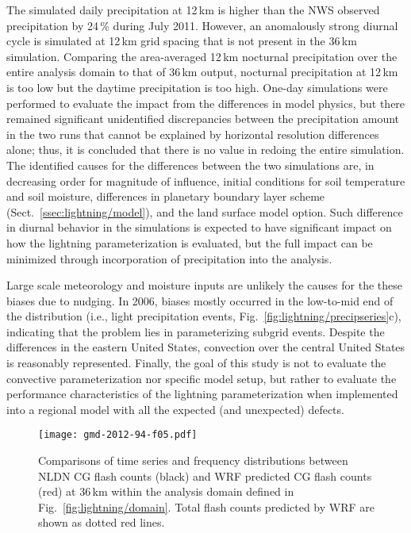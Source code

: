 The simulated daily precipitation at 12\,\unit{km} is higher than the NWS
observed precipitation by 24\,{\%} during July 2011. However, an anomalously
strong diurnal cycle is simulated at 12\,\unit{km} grid spacing that is not
present in the 36\,\unit{km} simulation. Comparing the area-averaged
12\,\unit{km} nocturnal precipitation over the entire analysis domain to that
of 36\,\unit{km} output, nocturnal precipitation at 12\,\unit{km} is too low
but the daytime precipitation is too high. One-day simulations were
performed to evaluate the impact from the differences in model physics, but
there remained significant unidentified discrepancies between the
precipitation amount in the two runs that cannot be explained by horizontal
resolution differences alone; thus, it is concluded that there is no value in
redoing the entire simulation. The identified causes for the differences
between the two simulations are, in decreasing order for magnitude of
influence, initial conditions for soil temperature and soil moisture,
differences in planetary boundary layer scheme (Sect.~\ref{ssec:lightning/model}), and
the land surface model option. Such difference in diurnal behavior in the
simulations is expected to have significant impact on how the lightning
parameterization is evaluated, but the full impact can be minimized through
incorporation of precipitation into the analysis.

Large scale meteorology and moisture inputs are unlikely the causes for the
these biases due to nudging. In 2006, biases mostly occurred in the
low-to-mid end of the distribution (i.e., light precipitation events,
Fig.~\ref{fig:lightning/precipseries}c), indicating that the problem lies in
parameterizing subgrid events. Despite the differences in the eastern United
States, convection over the central United States is reasonably represented.
Finally, the goal of this study is not to evaluate the convective
parameterization nor specific model setup, but rather to evaluate the
performance characteristics of the lightning parameterization when
implemented into a regional model with all the expected (and unexpected)
defects.


\begin{figure*}[t]
\texttt{[image: gmd-2012-94-f05.pdf]}
\caption{Comparisons of time series and frequency distributions between NLDN
CG flash counts (black) and WRF predicted CG flash counts (red) at
36\,\unit{km} within the analysis domain defined in Fig.~\ref{fig:lightning/domain}.
Total flash counts predicted by WRF are shown as dotted red lines.}
      \label{fig:lightning/cgseries}
\end{figure*}

